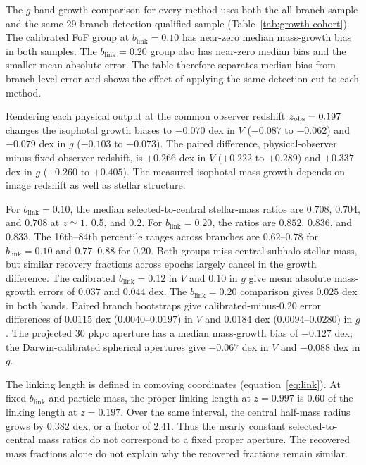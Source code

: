 \documentclass[usenatbib]{mnras}
\begin{document}
The $g$-band growth comparison for every method uses both the all-branch
sample and the same 29-branch detection-qualified sample (Table~\ref{tab:growth-cohort}).
The calibrated FoF group at $b_{\mathrm{link}}=0.10$ has near-zero
median mass-growth bias in both samples. The $b_{\mathrm{link}}=0.20$
group also has near-zero median bias and the smaller mean absolute error.
The table therefore separates median bias from branch-level error and
shows the effect of applying the same detection cut to each method.

Rendering each physical output at the common observer redshift
$z_{\rm obs}=0.197$ changes the isophotal growth biases to $-0.070$ dex
in $V$ ($-0.087$ to $-0.062$) and $-0.079$ dex in $g$ ($-0.103$ to
$-0.073$). The paired difference, physical-observer minus fixed-observer
redshift, is $+0.266$ dex in $V$ ($+0.222$ to $+0.289$) and $+0.337$ dex
in $g$ ($+0.260$ to $+0.405$). The measured isophotal mass growth depends on image redshift as well as stellar
structure.

For $b_{\mathrm{link}}=0.10$, the median selected-to-central stellar-mass
ratios are $0.708$, $0.704$, and $0.708$ at $z\simeq1$, 0.5, and 0.2.
For $b_{\mathrm{link}}=0.20$, the ratios are $0.852$, $0.836$, and
$0.833$. The 16th--84th percentile ranges across branches are
$0.62$--$0.78$ for $b_{\mathrm{link}}=0.10$ and $0.77$--$0.88$ for
$0.20$. Both groups miss central-subhalo stellar mass, but similar
recovery fractions across epochs largely cancel in the growth difference.
The calibrated $b_{\mathrm{link}}=0.12$ in $V$ and $0.10$ in $g$ give
mean absolute mass-growth errors of $0.037$ and $0.044$ dex. The
$b_{\mathrm{link}}=0.20$ comparison gives $0.025$ dex in both bands.
Paired branch bootstraps give calibrated-minus-0.20 error differences of
$0.0115$ dex ($0.0040$--$0.0197$) in $V$ and $0.0184$ dex
($0.0094$--$0.0280$) in $g$. The projected 30 pkpc aperture has a
median mass-growth bias of $-0.127$ dex; the Darwin-calibrated spherical
apertures give $-0.067$ dex in $V$ and $-0.088$ dex in $g$.

The linking length is defined in comoving coordinates (equation~\ref{eq:link}).
At fixed $b_{\mathrm{link}}$ and particle mass, the proper linking length at $z=0.997$
is $0.60$ of the linking length at $z=0.197$. Over the same interval, the central
half-mass radius grows by $0.382$ dex, or a factor of $2.41$. Thus the nearly
constant selected-to-central mass ratios do not correspond to a fixed proper
aperture. The recovered mass fractions alone do not explain why the recovered fractions
remain similar.
\end{document}

